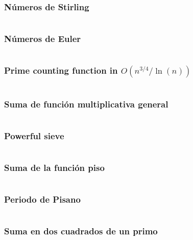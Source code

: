 \documentclass[11pt]{article}
\begin{document}
			\subsubsection{Números de Stirling}
			\inputminted[tabsize=2,breaklines,firstline=967,lastline=988,fontsize=\small]{c++}{numberTheory.cpp}
			
			\subsubsection{Números de Euler}
			\inputminted[tabsize=2,breaklines,firstline=990,lastline=1001,fontsize=\small]{c++}{numberTheory.cpp}
			
			\subsubsection{Prime counting function in $O(n^{3/4}/\ln(n))$}
			\inputminted[tabsize=2,breaklines,firstline=33,lastline=91,fontsize=\small]{c++}{pi.cpp}
			
			\subsubsection{Suma de función multiplicativa general}
			\inputminted[tabsize=2,breaklines,firstline=164,lastline=185,fontsize=\small]{c++}{pi.cpp}
			
			\subsubsection{Powerful sieve}
			\inputminted[tabsize=2,breaklines,firstline=187,lastline=206,fontsize=\small]{c++}{pi.cpp}
			
			\subsubsection{Suma de la función piso}
			\inputminted[tabsize=2,breaklines,firstline=1003,lastline=1010,fontsize=\small]{c++}{numberTheory.cpp}
			
			\subsubsection{Periodo de Pisano}
			\inputminted[tabsize=2,breaklines,firstline=1049,lastline=1076,fontsize=\small]{c++}{numberTheory.cpp}
			
			\subsubsection{Suma en dos cuadrados de un primo}
			\inputminted[tabsize=2,breaklines,firstline=1098,lastline=1117,fontsize=\small]{c++}{numberTheory.cpp}
			
\end{document}
